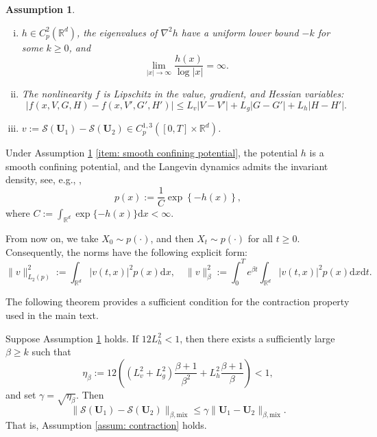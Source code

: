 \documentclass[twoside,11pt]{article}
\newcommand{\dd}{\mathrm{d}}
\newcommand{\R}{\mathbb{R}}
\newtheorem{assumption}{Assumption}
\newcommand{\1}{\mathbf{1}}
\numberwithin{equation}{section}
\begin{document}
\begin{assumption}\label{assum: langevin contraction setting}
\begin{enumerate}[(i)]
    \item \label{item: smooth confining potential} $ h \in C^2_p(\R^d)$, the eigenvalues of $\nabla^2h$ have a uniform lower bound $-k$ for some $k\ge0$, and
    \begin{equation}\label{eq: increase condition}
        \lim_{|x|\to\infty}\frac{h(x)}{\log |x|}=\infty.
    \end{equation}
    \item The nonlinearity $f$ is Lipschitz in the value, gradient, and Hessian variables:
    \begin{equation}
        |f(x,V,G, H) - f(x,V',G', H')| \le L_v |V-V'| + L_g|G - G'| + L_h|H - H'|.
    \end{equation}
    \item  $v:= \mathcal{S}(\mathbf{U}_1)-\mathcal{S}(\mathbf{U}_2) \in C^{1,3}_p([0,T]\times\mathbb R^d)$.
\end{enumerate}
\end{assumption}

Under Assumption \ref{assum: langevin contraction setting} \eqref{item: smooth confining potential}, the potential $h$ is a smooth confining potential, and the Langevin dynamics admits the invariant density, see, e.g., \cite[Proposition 4.2]{pavliotis2014Stochastic},
    \begin{equation}\label{eq: density of stationary dist}
        p(x) :=\frac{1}{C}\exp\left\{ -h(x)\right\},
    \end{equation}
    where $C:=\int_{\R^d}\exp\{-h(x)\}\dd x<\infty$. 
    
    From now on, we take $X_0\sim p(\cdot)$, and then $X_t\sim p(\cdot)$ for all $t\ge0$. Consequently, the norms have the following explicit form:
    \begin{equation}
    \|v\|_{L_2(p)}^2 := \int_{\R^d} |v(t,x)|^2p(x)\dd x, \quad\|v\|_{\beta}^2 := \int_0^T e^{\beta t}\int_{\R^d} |v(t,x)|^2p(x)\dd x\dd t.
    \end{equation}


The following theorem provides a sufficient condition for the contraction property used in the main text.

\begin{theorem}\label{thm: langevin sufficient contraction}
    Suppose Assumption \ref{assum: langevin contraction setting} holds. If $12L_h^2<1$, then there exists a sufficiently large $\beta\ge k$ such that
    \begin{equation}\label{eq: eta beta sufficient condition}
        \eta_\beta
        :=12\left((L_v^2+L_g^2)\frac{\beta+1}{\beta^2}
        +L_h^2\frac{\beta+1}{\beta}\right)<1,
    \end{equation}
    and set $\gamma=\sqrt{\eta_\beta}$. Then
    \begin{equation}
        \|\mathcal S(\mathbf U_1)-\mathcal S(\mathbf U_2)\|_{\beta,\textrm{mix}}
        \le \gamma \|\mathbf U_1-\mathbf U_2\|_{\beta,\textrm{mix}}.
    \end{equation}
That is, Assumption \ref{assum: contraction} holds.
\end{theorem}
\end{document}
